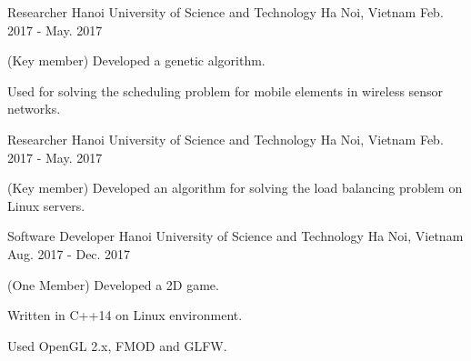 


\begin{cventries}


\cventry
{Researcher} %
{Hanoi University of Science and Technology} %
{Ha Noi, Vietnam} %
{Feb. 2017 - May. 2017} %
{ %
\begin{cvitems}
\item{(Key member) Developed a genetic algorithm.}
\item{Used for solving the scheduling problem for mobile elements in wireless sensor networks.}
\end{cvitems}
}


\cventry
{Researcher} %
{Hanoi University of Science and Technology} %
{Ha Noi, Vietnam} %
{Feb. 2017 - May. 2017} %
{ %
\begin{cvitems}
\item {(Key member) Developed an algorithm for solving the load balancing problem on Linux servers.}
\end{cvitems}
}


\cventry
{Software Developer} %
{Hanoi University of Science and Technology} %
{Ha Noi, Vietnam} %
{Aug. 2017 - Dec. 2017} %
{ %
\begin{cvitems}
\item {(One Member) Developed a 2D game.}
\item{Written in C++14 on Linux environment.}
\item {Used OpenGL 2.x, FMOD and GLFW.} 
\end{cvitems}
}


\end{cventries}

